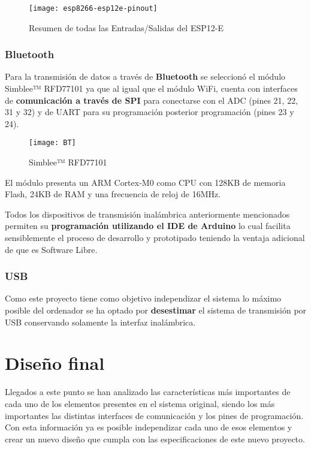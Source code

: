 \clearpage

\begin{figure} [h]
    \centering
    \texttt{[image: esp8266-esp12e-pinout]}
    \caption{Resumen de todas las Entradas/Salidas del ESP12-E \cite{ESP_Pinout}}
    \label{fig:ESP8266_pinout}
\end{figure}

\subsubsection{Bluetooth\label{sec:Bluetooth_N}}

Para la transmisión de datos a través de \textbf{Bluetooth} se seleccionó el módulo Simblee™ RFD77101 ya que al igual que el módulo WiFi, cuenta con interfaces de \textbf{comunicación a través de \acrshort{SPI}} para conectarse con el \acrshort{ADC} (pines 21, 22, 31 y 32) y de \acrshort{UART} para su programación posterior programación (pines 23 y 24).

\begin{figure} [H]
    \centering
    \texttt{[image: BT]}
    \caption{Simblee™ RFD77101 \cite{Datasheet_BT}}
    \label{fig:BT}
\end{figure}

El módulo presenta un ARM Cortex-M0 como \acrshort{CPU} con 128KB de memoria Flash, 24KB de \acrshort{RAM} y una frecuencia de reloj de 16MHz. 

Todos los dispositivos de transmisión inalámbrica anteriormente mencionados permiten su \textbf{programación utilizando el \acrshort{IDE} de Arduino} lo cual facilita sensiblemente el proceso de desarrollo y prototipado teniendo la ventaja adicional de que es Software Libre.


\subsubsection{USB\label{sec:USB_N}}


Como este proyecto tiene como objetivo independizar el sistema lo máximo posible del ordenador se ha optado por \textbf{desestimar} el sistema de transmisión por \acrshort{USB} conservando solamente la interfaz inalámbrica. 

\section{Diseño final\label{sec:Diseño_final}}
          
Llegados a este punto se han analizado las características más importantes de cada uno de los elementos presentes en el sistema original, siendo los más importantes las distintas interfaces de comunicación y los pines de programación.
\\Con esta información ya es posible independizar cada uno de esos elementos y crear un nuevo diseño que cumpla con las especificaciones de este nuevo proyecto.

